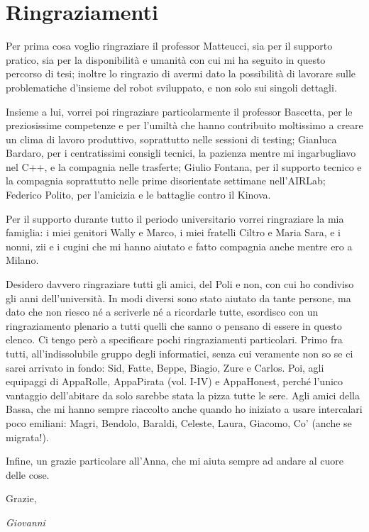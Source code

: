 
\bigskip

\begingroup
\let\clearpage\relax
\let\cleardoublepage\relax
\let\cleardoublepage\relax
\chapter*{Ringraziamenti}
Per prima cosa voglio ringraziare il professor Matteucci, sia per il supporto pratico, sia per la disponibilità e umanità con cui mi ha seguito in questo percorso di tesi; inoltre lo ringrazio di avermi dato la possibilità di lavorare sulle problematiche d'insieme del robot sviluppato, e non solo sui singoli dettagli.
\par Insieme a lui, vorrei poi ringraziare particolarmente il professor Bascetta, per le preziosissime competenze e per l'umiltà che hanno contribuito moltissimo a creare un clima di lavoro produttivo, soprattutto nelle sessioni di testing; Gianluca Bardaro, per i centratissimi consigli tecnici, la pazienza mentre mi ingarbugliavo nel C++, e la compagnia nelle trasferte; Giulio Fontana, per il supporto tecnico e la compagnia soprattutto nelle prime disorientate settimane nell'AIRLab; Federico Polito, per l'amicizia e le battaglie contro il Kinova.
\par Per il supporto durante tutto il periodo universitario vorrei ringraziare la mia famiglia: i miei genitori Wally e Marco, i miei fratelli Ciltro e Maria Sara, e i nonni, zii e i cugini che mi hanno aiutato e fatto compagnia anche mentre ero a Milano. 
\par Desidero davvero ringraziare tutti gli amici, del Poli e non, con cui ho condiviso gli anni dell'università. In modi diversi sono stato aiutato da tante persone, ma dato che non riesco né a scriverle né a ricordarle tutte, esordisco con un ringraziamento plenario a tutti quelli che sanno o pensano di essere in questo elenco. Ci tengo però a specificare pochi ringraziamenti particolari. Primo fra tutti, all'indissolubile gruppo degli informatici, senza cui veramente non so se ci sarei arrivato in fondo: Sid, Fatte, Beppe, Biagio, Zure e Carlos.
Poi, agli equipaggi di AppaRolle, AppaPirata (vol. I-IV) e AppaHonest, perché l'unico vantaggio dell'abitare da solo sarebbe stata la pizza tutte le sere. Agli amici della Bassa, che mi hanno sempre riaccolto anche quando ho iniziato a usare intercalari poco emiliani: Magri, Bendolo, Baraldi, Celeste, Laura, Giacomo, Co' (anche se migrata!).
\par Infine, un grazie particolare all'Anna, che mi aiuta sempre ad andare al cuore delle cose.
\par Grazie,
\begin{flushright}
\textit{Giovanni}
\end{flushright}


\endgroup